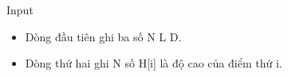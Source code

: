 Input
\begin{itemize}
	\item Dòng đầu tiên ghi ba số N L D.
	\item Dòng thứ hai ghi N số H[i] là độ cao của điểm thứ i.
\end{itemize}